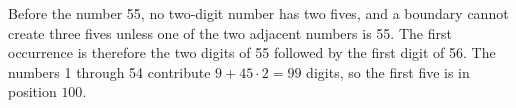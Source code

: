 Before the number 55, no two-digit number has two fives, and a boundary cannot create three fives unless one of the two adjacent numbers is 55. The first occurrence is therefore the two digits of 55 followed by the first digit of 56. The numbers 1 through 54 contribute $9+45\cdot2=99$ digits, so the first five is in position $\boxed{100}$.

